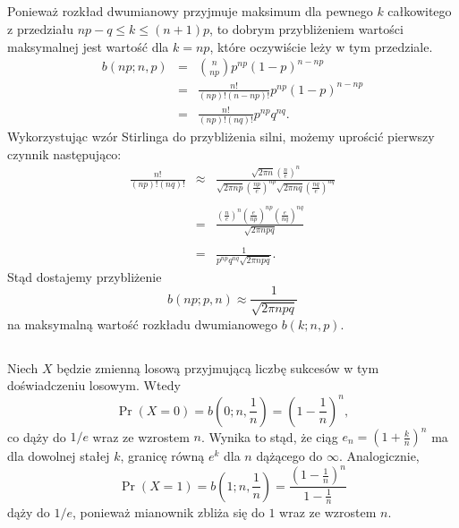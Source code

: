 \subsection{} %
Ponieważ rozkład dwumianowy przyjmuje maksimum dla pewnego $k$ całkowitego z przedziału $np-q\le k\le (n+1)p$, to dobrym przybliżeniem wartości maksymalnej jest wartość dla $k=np$, które oczywiście leży w tym przedziale.
\begin{eqnarray*}
	b(np;n,p) &=& \binom{n}{np}p^{np}(1-p)^{n-np} \\
	&=& \frac{n!}{(np)!(n-np)!}p^{np}(1-p)^{n-np} \\
	&=& \frac{n!}{(np)!(nq)!}p^{np}q^{nq}.
\end{eqnarray*}
Wykorzystując wzór Stirlinga do przybliżenia silni, możemy uprościć pierwszy czynnik następująco:
\begin{eqnarray*}
	\frac{n!}{(np)!(nq)!} &\approx& \frac{\sqrt{2\pi n}\left(\frac{n}{e}\right)^n}{\sqrt{2\pi np}\left(\frac{np}{e}\right)^{np}\sqrt{2\pi nq}\left(\frac{nq}{e}\right)^{nq}} \\\\
	&=& \frac{\left(\frac{n}{e}\right)^n\left(\frac{e}{np}\right)^{np}\left(\frac{e}{nq}\right)^{nq}}{\sqrt{2\pi npq}} \\\\
	&=& \frac{1}{p^{np}q^{nq}\sqrt{2\pi npq}}.
\end{eqnarray*}
Stąd dostajemy przybliżenie
\[
	b(np;p,n)\approx\frac{1}{\sqrt{2\pi npq}}
\]
na maksymalną wartość rozkładu dwumianowego $b(k;n,p)$.

\subsection{} %
Niech $X$ będzie zmienną losową przyjmującą liczbę sukcesów w tym doświadczeniu losowym. Wtedy
\[
	\Pr(X=0) = b\left(0;n,\frac{1}{n}\right) = \left(1-\frac{1}{n}\right)^n,
\]
co dąży do $1/e$ wraz ze wzrostem $n$. Wynika to stąd, że ciąg $e_n=\left(1+\frac{k}{n}\right)^n$ ma dla dowolnej stałej $k$, granicę równą $e^k$ dla $n$ dążącego do $\infty$.
Analogicznie,
\[
	\Pr(X=1) = b\left(1;n,\frac{1}{n}\right) = \frac{\left(1-\frac{1}{n}\right)^n}{1-\frac{1}{n}}
\]
dąży do $1/e$, ponieważ mianownik zbliża się do $1$ wraz ze wzrostem $n$.

